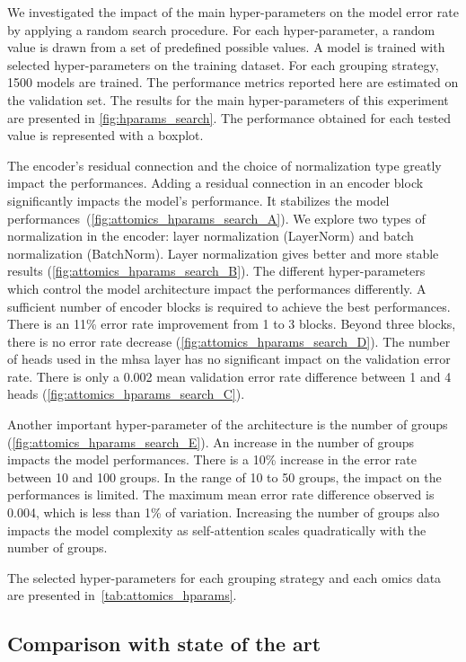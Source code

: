 \documentclass[../main.tex]{subfiles}
\begin{document}
		We investigated the impact of the main hyper-parameters on the model error rate by applying a random search procedure.
		For each hyper-parameter, a random value is drawn from a set of predefined possible values.
		A model is trained with selected hyper-parameters on the training dataset.
		For each grouping strategy, 1500 models are trained.
		The performance metrics reported here are estimated on the validation set.
		The results for the main hyper-parameters of this experiment are presented in \cref{fig:hparams_search}.
		The performance obtained for each tested value is represented with a boxplot.

		The encoder's residual connection and the choice of normalization type greatly impact the performances.
		Adding a residual connection in an encoder block significantly impacts the model's performance.
		It stabilizes the model performances~(\cref{fig:attomics_hparams_search_A}).
		We explore two types of normalization in the encoder: layer normalization (LayerNorm) and batch normalization (BatchNorm).
		Layer normalization gives better and more stable results (\cref{fig:attomics_hparams_search_B}).
		The different hyper-parameters which control the model architecture impact the performances differently.
		A sufficient number of encoder blocks is required to achieve the best performances.
		There is an 11\% error rate improvement from 1 to 3 blocks.
		Beyond three blocks, there is no error rate decrease (\cref{fig:attomics_hparams_search_D}).
		The number of heads used in the \gls{mhsa} layer has no significant impact on the validation error rate.
		There is only a 0.002 mean validation error rate difference between 1 and 4 heads (\cref{fig:attomics_hparams_search_C}).

		Another important hyper-parameter of the architecture is the number of groups (\cref{fig:attomics_hparams_search_E}).
		An increase in the number of groups impacts the model performances.
		There is a 10\% increase in the error rate between 10 and 100 groups.
		In the range of 10 to 50 groups, the impact on the performances is limited.
		The maximum mean error rate difference observed is 0.004, which is less than 1\% of variation.
		Increasing the number of groups also impacts the model complexity as self-attention scales quadratically with the number of groups.

		The selected hyper-parameters for each grouping strategy and each omics data are presented in~\cref{tab:attomics_hparams}.

	\subsection{Comparison with state of the art}
\end{document}
